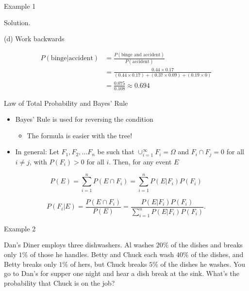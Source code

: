 \documentclass[
  ignorenonframetext,
]{beamer}
\providecommand{\tightlist}{%
  \setlength{\itemsep}{0pt}\setlength{\parskip}{0pt}}
\begin{document}
\begin{frame}{Example 1}
\protect\hypertarget{example-1-3}{}
\begin{tcolorbox}
Solution. 

(d) Work backwards


$$\begin{array}{ll}
 P(\text{binge|accident})&=\frac{P(\text{binge and accident})}{P(\text{accident})}\\
&=\frac{0.44\times 0.17}{(0.44\times0.17)+(0.37\times0.09)+(0.19\times 0)}\\
&=\frac{0.075}{0.108}\approx0.694
\end{array}$$ 


\end{tcolorbox}
\end{frame}

\begin{frame}{Law of Total Probability and Bayes' Rule}
\protect\hypertarget{law-of-total-probability-and-bayes-rule-1}{}
\begin{itemize}
\item
  Bayes' Rule is used for reversing the condition

  \begin{itemize}
  \tightlist
  \item
    The formula is easier with the tree!
  \end{itemize}
\item
  In general: Let \(F_1, F_2, \ldots F_n\) be such that
  \(\cup_{i=1}^{\infty} F_i=\Omega\) and \(F_i\cap F_j=0\) for all
  \(i\neq j\), with \(P(F_i)>0\) for all \(i\). Then, for any event
  \(E\)
\end{itemize}

\[P(E)=\sum_{i=1}^n P(E \cap F_i)=\sum_{i=1}^n P(E|F_i)P(F_i)\]

\[P(F_i|E)=\frac{P(E \cap F_i)}{P(E)}=\frac{P(E|F_i)P(F_i)}{\sum_{i=1}^nP(E|F_i)P(F_i)}.\]
\end{frame}

\begin{frame}{Example 2}
\protect\hypertarget{example-2}{}
\begin{tcolorbox}
Dan's Diner employs three dishwashers. Al washes $20\%$ of the dishes and breaks only $1\%$ of those he handles. Betty and Chuck each wash $40\%$ of the dishes, and Betty breaks only $1\%$ of hers, but Chuck breaks $5\%$ of the dishes he washes. You go to Dan's for supper one night and hear a dish break at the sink. What's the probability that Chuck is on the job?


\end{tcolorbox}
\end{frame}
\end{document}
